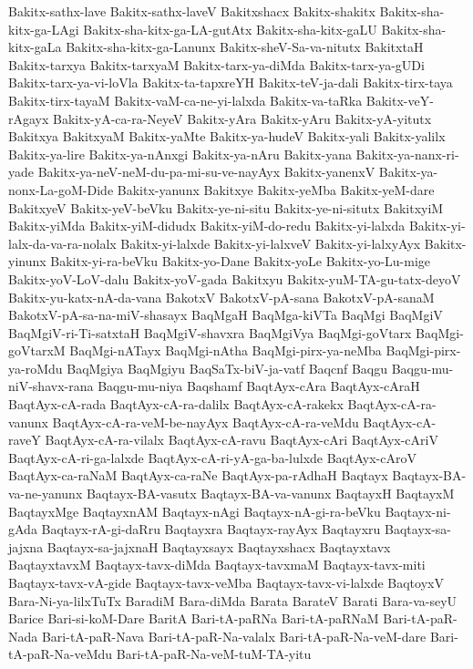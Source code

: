 {Bakitx-sathx-lave
Bakitx-sathx-laveV
Bakitxshacx
Bakitx-shakitx
Bakitx-sha-kitx-ga-LAgi
Bakitx-sha-kitx-ga-LA-gutAtx
Bakitx-sha-kitx-gaLU
Bakitx-sha-kitx-gaLa
Bakitx-sha-kitx-ga-Lanunx
Bakitx-sheV-Sa-va-nitutx
BakitxtaH
Bakitx-tarxya
Bakitx-tarxyaM
Bakitx-tarx-ya-diMda
Bakitx-tarx-ya-gUDi
Bakitx-tarx-ya-vi-loVla
Bakitx-ta-tapxreYH
Bakitx-teV-ja-dali
Bakitx-tirx-taya
Bakitx-tirx-tayaM
Bakitx-vaM-ca-ne-yi-lalxda
Bakitx-va-taRka
Bakitx-veY-rAgayx
Bakitx-yA-ca-ra-NeyeV
Bakitx-yAra
Bakitx-yAru
Bakitx-yA-yitutx
Bakitxya
BakitxyaM
Bakitx-yaMte
Bakitx-ya-hudeV
Bakitx-yali
Bakitx-yalilx
Bakitx-ya-lire
Bakitx-ya-nAnxgi
Bakitx-ya-nAru
Bakitx-yana
Bakitx-ya-nanx-ri-yade
Bakitx-ya-neV-neM-du-pa-mi-su-ve-nayAyx
Bakitx-yanenxV
Bakitx-ya-nonx-La-goM-Dide
Bakitx-yanunx
Bakitxye
Bakitx-yeMba
Bakitx-yeM-dare
BakitxyeV
Bakitx-yeV-beVku
Bakitx-ye-ni-situ
Bakitx-ye-ni-situtx
BakitxyiM
Bakitx-yiMda
Bakitx-yiM-didudx
Bakitx-yiM-do-redu
Bakitx-yi-lalxda
Bakitx-yi-lalx-da-va-ra-nolalx
Bakitx-yi-lalxde
Bakitx-yi-lalxveV
Bakitx-yi-lalxyAyx
Bakitx-yinunx
Bakitx-yi-ra-beVku
Bakitx-yo-Dane
Bakitx-yoLe
Bakitx-yo-Lu-mige
Bakitx-yoV-LoV-dalu
Bakitx-yoV-gada
Bakitxyu
Bakitx-yuM-TA-gu-tatx-deyoV
Bakitx-yu-katx-nA-da-vana
BakotxV
BakotxV-pA-sana
BakotxV-pA-sanaM
BakotxV-pA-sa-na-miV-shasayx
BaqMgaH
BaqMga-kiVTa
BaqMgi
BaqMgiV
BaqMgiV-ri-Ti-satxtaH
BaqMgiV-shavxra
BaqMgiVya
BaqMgi-goVtarx
BaqMgi-goVtarxM
BaqMgi-nATayx
BaqMgi-nAtha
BaqMgi-pirx-ya-neMba
BaqMgi-pirx-ya-roMdu
BaqMgiya
BaqMgiyu
BaqSaTx-biV-ja-vatf
Baqcnf
Baqgu
Baqgu-mu-niV-shavx-rana
Baqgu-mu-niya
Baqshamf
BaqtAyx-cAra
BaqtAyx-cAraH
BaqtAyx-cA-rada
BaqtAyx-cA-ra-dalilx
BaqtAyx-cA-rakekx
BaqtAyx-cA-ra-vanunx
BaqtAyx-cA-ra-veM-be-nayAyx
BaqtAyx-cA-ra-veMdu
BaqtAyx-cA-raveY
BaqtAyx-cA-ra-vilalx
BaqtAyx-cA-ravu
BaqtAyx-cAri
BaqtAyx-cAriV
BaqtAyx-cA-ri-ga-lalxde
BaqtAyx-cA-ri-yA-ga-ba-lulxde
BaqtAyx-cAroV
BaqtAyx-ca-raNaM
BaqtAyx-ca-raNe
BaqtAyx-pa-rAdhaH
Baqtayx
Baqtayx-BA-va-ne-yanunx
Baqtayx-BA-vasutx
Baqtayx-BA-va-vanunx
BaqtayxH
BaqtayxM
BaqtayxMge
BaqtayxnAM
Baqtayx-nAgi
Baqtayx-nA-gi-ra-beVku
Baqtayx-ni-gAda
Baqtayx-rA-gi-daRru
Baqtayxra
Baqtayx-rayAyx
Baqtayxru
Baqtayx-sa-jajxna
Baqtayx-sa-jajxnaH
Baqtayxsayx
Baqtayxshacx
Baqtayxtavx
BaqtayxtavxM
Baqtayx-tavx-diMda
Baqtayx-tavxmaM
Baqtayx-tavx-miti
Baqtayx-tavx-vA-gide
Baqtayx-tavx-veMba
Baqtayx-tavx-vi-lalxde
BaqtoyxV
Bara-Ni-ya-lilxTuTx
BaradiM
Bara-diMda
Barata
BarateV
Barati
Bara-va-seyU
Barice
Bari-si-koM-Dare
BaritA
Bari-tA-paRNa
Bari-tA-paRNaM
Bari-tA-paR-Nada
Bari-tA-paR-Nava
Bari-tA-paR-Na-valalx
Bari-tA-paR-Na-veM-dare
Bari-tA-paR-Na-veMdu
Bari-tA-paR-Na-veM-tuM-TA-yitu
}
